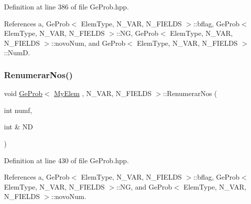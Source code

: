 Definition at line 386 of file Ge\+Prob.\+hpp.



References a, Ge\+Prob$<$ Elem\+Type, N\+\_\+\+V\+A\+R, N\+\_\+\+F\+I\+E\+L\+D\+S $>$\+::bflag, Ge\+Prob$<$ Elem\+Type, N\+\_\+\+V\+A\+R, N\+\_\+\+F\+I\+E\+L\+D\+S $>$\+::\+NG, Ge\+Prob$<$ Elem\+Type, N\+\_\+\+V\+A\+R, N\+\_\+\+F\+I\+E\+L\+D\+S $>$\+::novo\+Num, and Ge\+Prob$<$ Elem\+Type, N\+\_\+\+V\+A\+R, N\+\_\+\+F\+I\+E\+L\+D\+S $>$\+::\+NumD.

\mbox{\label{classGeProb_aa656597aedeff1096736c98b1f51c55f}} 
\subsubsection{\texorpdfstring{Renumerar\+Nos()}{RenumerarNos()}\hspace{0.1cm}{\footnotesize\ttfamily [2/2]}}
{\footnotesize\ttfamily void \hyperlink{classGeProb}{Ge\+Prob}$<$ \hyperlink{DG__Prob_8h_a83cd887ced9a6587428f267e50cd4787}{My\+Elem} , N\+\_\+\+V\+AR, N\+\_\+\+F\+I\+E\+L\+DS $>$\+::Renumerar\+Nos (\begin{DoxyParamCaption}\item[{int}]{numf,  }\item[{int \&}]{ND }\end{DoxyParamCaption})\hspace{0.3cm}{\ttfamily [inherited]}}



Definition at line 430 of file Ge\+Prob.\+hpp.



References a, Ge\+Prob$<$ Elem\+Type, N\+\_\+\+V\+A\+R, N\+\_\+\+F\+I\+E\+L\+D\+S $>$\+::bflag, Ge\+Prob$<$ Elem\+Type, N\+\_\+\+V\+A\+R, N\+\_\+\+F\+I\+E\+L\+D\+S $>$\+::\+NG, and Ge\+Prob$<$ Elem\+Type, N\+\_\+\+V\+A\+R, N\+\_\+\+F\+I\+E\+L\+D\+S $>$\+::novo\+Num.

\mbox{\label{classGeProb_a479ff26c0f91f09a7b92cabf9894c64e}} 
